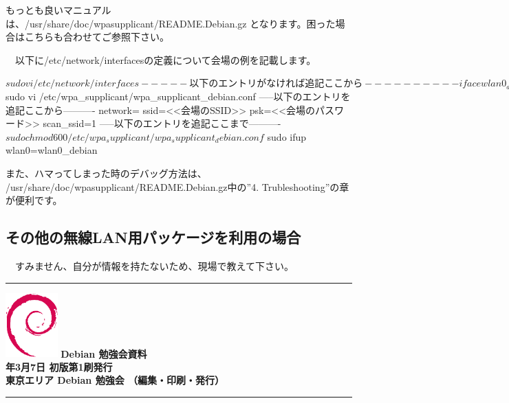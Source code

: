 \documentclass[mingoth,a4paper]{jsarticle}
\newcommand{\debmtgyear}{2015}
\newcommand{\debmtgmonth}{3}
\newcommand{\debmtgdate}{7}
\begin{document}
 もっとも良いマニュアルは、/usr/share/doc/wpasupplicant/README.Debian.gz
となります。困った場合はこちらも合わせてご参照下さい。

　以下に/etc/network/interfacesの定義について会場の例を記載します。

\begin{commandline}
$ sudo vi /etc/network/interfaces
-----以下のエントリがなければ追記ここから----------
iface wlan0_debian inet dhcp
     wpa-conf /etc/wpa_supplicant/wpa_supplicant_debian.conf
-----以下のエントリがなければ追記ここまで----------
$ sudo vi /etc/wpa_supplicant/wpa_supplicant_debian.conf
-----以下のエントリを追記ここから----------
network={
     ssid=<<会場のSSID>>
     psk=<<会場のパスワード>>
     scan_ssid=1
}
-----以下のエントリを追記ここまで----------
$ sudo chmod 600 /etc/wpa_supplicant/wpa_supplicant_debian.conf
$ sudo ifup wlan0=wlan0_debian
\end{commandline}

 また、ハマってしまった時のデバッグ方法は、
/usr/share/doc/wpasupplicant/README.Debian.gz中の''4. Trubleshooting''の章が便利です。

 \subsection{その他の無線LAN用パッケージを利用の場合}

　すみません、自分が情報を持たないため、現場で教えて下さい。

\cleartooddpage

\vspace*{15cm}
\hrule
\vspace{2mm}
\includegraphics[width=2cm]{image200502/openlogo-nd.eps}
\noindent \Large \bf Debian 勉強会資料\\
\noindent \normalfont \debmtgyear{}年\debmtgmonth{}月\debmtgdate{}日 \hspace{5mm}  初版第1刷発行\\
\noindent \normalfont 東京エリア Debian 勉強会 （編集・印刷・発行）\\
\hrule
\end{document}
